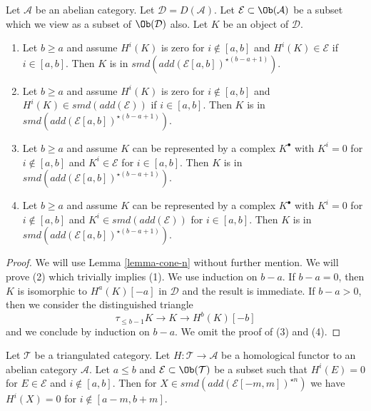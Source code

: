 \begin{lemma}
\label{lemma-in-cone-n}
Let $\mathcal{A}$ be an abelian category. Let $\mathcal{D} = D(\mathcal{A})$.
Let $\mathcal{E} \subset \Ob(\mathcal{A})$ be a subset which we view as
a subset of $\Ob(\mathcal{D})$ also. Let $K$ be an object of $\mathcal{D}$.
\begin{enumerate}
\item Let $b \geq a$ and assume $H^i(K)$ is zero for $i \not \in [a, b]$
and $H^i(K) \in \mathcal{E}$ if $i \in [a, b]$. Then $K$ is in
$smd(add(\mathcal{E}[a, b])^{\star (b - a + 1)})$.
\item Let $b \geq a$ and assume $H^i(K)$ is zero for $i \not \in [a, b]$
and $H^i(K) \in smd(add(\mathcal{E}))$ if $i \in [a, b]$. Then $K$ is in
$smd(add(\mathcal{E}[a, b])^{\star (b - a + 1)})$.
\item Let $b \geq a$ and assume $K$ can be represented by a complex $K^\bullet$
with $K^i = 0$ for $i \not \in [a, b]$ and $K^i \in \mathcal{E}$ for
$i \in [a, b]$. Then $K$ is in
$smd(add(\mathcal{E}[a, b])^{\star (b - a + 1)})$.
\item Let $b \geq a$ and assume $K$ can be represented by a complex $K^\bullet$
with $K^i = 0$ for $i \not \in [a, b]$ and $K^i \in smd(add(\mathcal{E}))$ for
$i \in [a, b]$. Then $K$ is in
$smd(add(\mathcal{E}[a, b])^{\star (b - a + 1)})$.
\end{enumerate}
\end{lemma}

\begin{proof}
We will use Lemma \ref{lemma-cone-n} without further mention.
We will prove (2) which trivially implies (1). We use induction
on $b - a$. If $b - a = 0$, then $K$ is isomorphic to $H^a(K)[-a]$
in $\mathcal{D}$ and the result is immediate. If $b - a > 0$, then
we consider the distinguished triangle
$$
\tau_{\leq b - 1}K \to K \to H^b(K)[-b]
$$
and we conclude by induction on $b - a$. We omit the proof of (3) and (4).
\end{proof}

\begin{lemma}
\label{lemma-forward-cone-n}
Let $\mathcal{T}$ be a triangulated category. Let
$H : \mathcal{T} \to \mathcal{A}$ be a homological functor
to an abelian category $\mathcal{A}$.
Let $a \leq b$ and $\mathcal{E} \subset \Ob(\mathcal{T})$
be a subset such that $H^i(E) = 0$ for $E \in \mathcal{E}$
and $i \not \in [a, b]$.
Then for $X \in smd(add(\mathcal{E}[-m, m])^{\star n})$
we have $H^i(X) = 0$ for $i \not \in [a - m, b + m]$.
\end{lemma}

